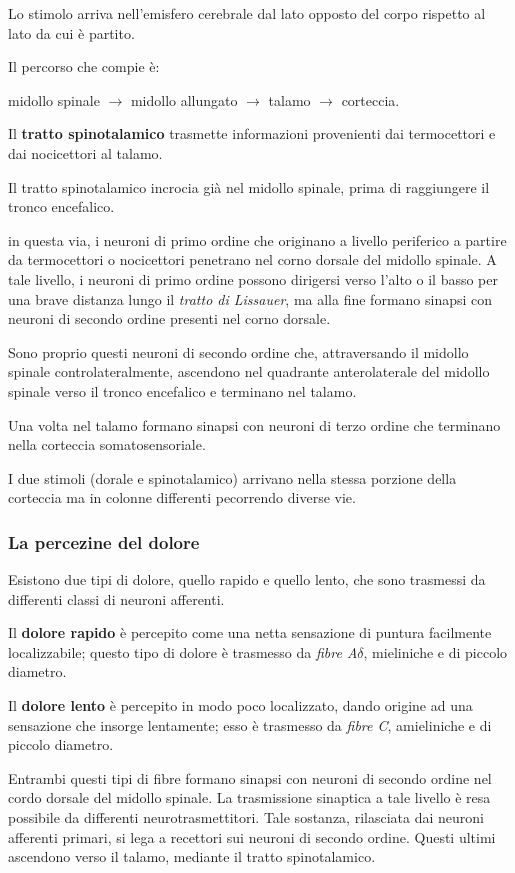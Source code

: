 \documentclass[]{article}
\begin{document}
Lo stimolo arriva nell'emisfero cerebrale dal lato opposto del corpo
rispetto al lato da cui è partito.

Il percorso che compie è:

midollo spinale \(\rightarrow\) midollo allungato \(\rightarrow\) talamo
\(\rightarrow\) corteccia.

Il \textbf{tratto spinotalamico} trasmette informazioni provenienti dai
termocettori e dai nocicettori al talamo.

Il tratto spinotalamico incrocia già nel midollo spinale, prima di
raggiungere il tronco encefalico.

in questa via, i neuroni di primo ordine che originano a livello
periferico a partire da termocettori o nocicettori penetrano nel corno
dorsale del midollo spinale. A tale livello, i neuroni di primo ordine
possono dirigersi verso l'alto o il basso per una brave distanza lungo
il \emph{tratto di Lissauer}, ma alla fine formano sinapsi con neuroni
di secondo ordine presenti nel corno dorsale.

Sono proprio questi neuroni di secondo ordine che, attraversando il
midollo spinale controlateralmente, ascendono nel quadrante
anterolaterale del midollo spinale verso il tronco encefalico e
terminano nel talamo.

Una volta nel talamo formano sinapsi con neuroni di terzo ordine che
terminano nella corteccia somatosensoriale.

I due stimoli (dorale e spinotalamico) arrivano nella stessa porzione
della corteccia ma in colonne differenti pecorrendo diverse vie.

\subsubsection{La percezine del dolore}\label{la-percezine-del-dolore}

Esistono due tipi di dolore, quello rapido e quello lento, che sono
trasmessi da differenti classi di neuroni afferenti.

Il \textbf{dolore rapido} è percepito come una netta sensazione di
puntura facilmente localizzabile; questo tipo di dolore è trasmesso da
\emph{fibre A\(\delta\)}, mieliniche e di piccolo diametro.

Il \textbf{dolore lento} è percepito in modo poco localizzato, dando
origine ad una sensazione che insorge lentamente; esso è trasmesso da
\emph{fibre C}, amieliniche e di piccolo diametro.

Entrambi questi tipi di fibre formano sinapsi con neuroni di secondo
ordine nel cordo dorsale del midollo spinale. La trasmissione sinaptica
a tale livello è resa possibile da differenti neurotrasmettitori. Tale
sostanza, rilasciata dai neuroni afferenti primari, si lega a recettori
sui neuroni di secondo ordine. Questi ultimi ascendono verso il talamo,
mediante il tratto spinotalamico.
\end{document}
